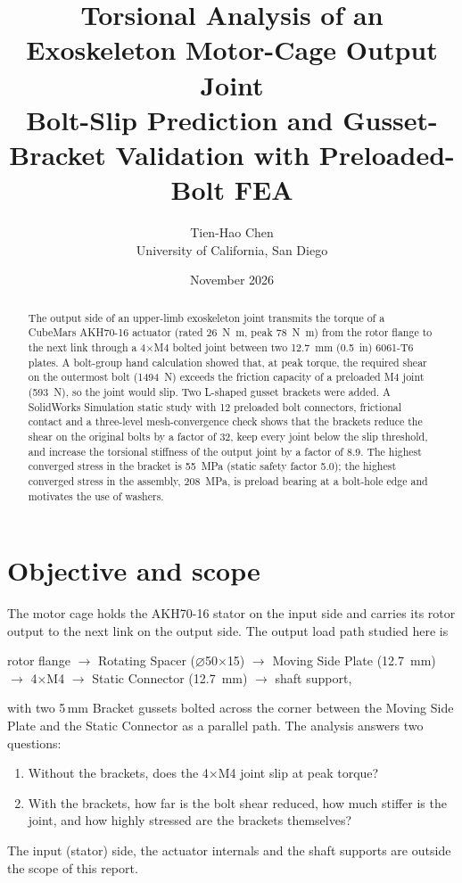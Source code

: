 \documentclass[11pt,letterpaper]{article}
\title{\textbf{Torsional Analysis of an Exoskeleton Motor-Cage Output Joint}\\[4pt]
\large Bolt-Slip Prediction and Gusset-Bracket Validation with Preloaded-Bolt FEA}
\author{Tien-Hao Chen\\University of California, San Diego}
\date{November 2026}
\begin{document}
\maketitle

\begin{abstract}
\noindent
The output side of an upper-limb exoskeleton joint transmits the torque of a CubeMars
AKH70-16 actuator (rated \SI{26}{\newton\metre}, peak \SI{78}{\newton\metre}) from the
rotor flange to the next link through a 4$\times$M4 bolted joint between two
\SI{12.7}{mm} (\SI{0.5}{in}) 6061-T6 plates. A bolt-group hand calculation showed that, at
peak torque, the required shear on the outermost bolt (\SI{1494}{\newton}) exceeds the
friction capacity of a preloaded M4 joint (\SI{593}{\newton}), so the joint would slip.
Two L-shaped gusset brackets were added. A SolidWorks Simulation static study with
12 preloaded bolt connectors, frictional contact and a three-level mesh-convergence
check shows that the brackets reduce the shear on the original bolts by a factor of
\num{32}, keep every joint below the slip threshold, and increase the torsional
stiffness of the output joint by a factor of \num{8.9}. The highest converged stress in
the bracket is \SI{55}{MPa} (static safety factor \num{5.0}); the highest converged
stress in the assembly, \SI{208}{MPa}, is preload bearing at a bolt-hole edge and
motivates the use of washers.
\end{abstract}

\section{Objective and scope}
The motor cage holds the AKH70-16 stator on the input side and carries its rotor output
to the next link on the output side. The output load path studied here is
\begin{center}
rotor flange $\rightarrow$ Rotating Spacer ($\varnothing$50$\times$15)
$\rightarrow$ Moving Side Plate (\SI{12.7}{mm})
$\rightarrow$ 4$\times$M4 $\rightarrow$ Static Connector (\SI{12.7}{mm})
$\rightarrow$ shaft support,
\end{center}
with two 5\,mm Bracket gussets bolted across the corner between the Moving Side Plate
and the Static Connector as a parallel path. The analysis answers two questions:
\begin{enumerate}
  \item Without the brackets, does the 4$\times$M4 joint slip at peak torque?
  \item With the brackets, how far is the bolt shear reduced, how much stiffer is the
        joint, and how highly stressed are the brackets themselves?
\end{enumerate}
The input (stator) side, the actuator internals and the shaft supports are outside the
scope of this report.
\end{document}
